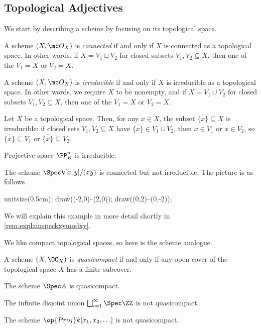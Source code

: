 \documentclass[../notes.tex]{subfiles}
\begin{document}
\subsection{Topological Adjectives}
We start by describing a scheme by focusing on its topological space.
\begin{definition}[Connected]
	A scheme $(X,\mc O_X)$ is \textit{connected} if and only if $X$ is connected as a topological space. In other words, if $X=V_1\sqcup V_2$ for closed subsets $V_1,V_2\subseteq X$, then one of the $V_1=X$ or $V_2=X$.
\end{definition}
\begin{definition}[Irreducible]
	A scheme $(X,\mc O_X)$ is \textit{irreducible} if and only if $X$ is irreducible as a topological space. In other words, we require $X$ to be nonempty, and if $X=V_1\cup V_2$ for closed subsets $V_1,V_2\subseteq X$, then one of the $V_1=X$ or $V_2=X$.
\end{definition}
\begin{example} \label{ex:closurepoint}
	Let $X$ be a topological space. Then, for any $x\in X$, the subset $\overline{\{x\}}\subseteq X$ is irreducible: if closed sets $V_1,V_2\subseteq X$ have $\overline{\{x\}}\in V_1\cup V_2$, then $x\in V_1$ or $x\in V_2$, so $\overline{\{x\}}\subseteq V_1$ or $\overline{\{x\}}\subseteq V_2$.
\end{example}
\begin{example}
	Projective space $\PP^n_R$ is irreducible.
\end{example}
\begin{nex} \label{nex:speckxymodxy}
	The scheme $\Spec k[x,y]/(xy)$ is connected but not irreducible. The picture is as follows.
	\begin{center}
		\begin{asy}
			unitsize(0.5cm);
			draw((-2,0)--(2,0));
			draw((0,2)--(0,-2));
		\end{asy}
	\end{center}
	We will explain this example in more detail shortly in \autoref{rem:explainspeckxymodxy}.
\end{nex}
We like compact topological spaces, so here is the scheme analogue.
\begin{definition}[Quasicompact]
	A scheme $(X,\OO_X)$ is \textit{quasicompact} if and only if any open cover of the topological space $X$ has a finite subcover.
\end{definition}
\begin{example}
	The scheme $\Spec A$ is quasicompact.
\end{example}
\begin{nex} \label{nex:notquasicompactscheme}
	The infinite disjoint union $\bigsqcup_{i=1}^\infty\Spec\ZZ$ is not quasicompact.
\end{nex}
\begin{nex}
	The scheme $\op{Proj}k[x_1,x_2,\ldots]$ is not quasicompact.
\end{nex}
\end{document}
